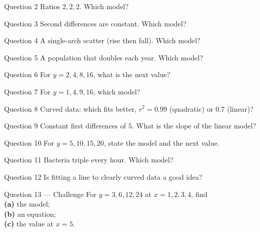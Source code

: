 \documentclass[11pt]{article}
\begin{document}
\begin{qbox}{Question 2}
Ratios $2,2,2$. Which model?\workspace{2.4cm}
\end{qbox}

\begin{qbox}{Question 3}
Second differences are constant. Which model?\workspace{2.4cm}
\end{qbox}

\begin{qbox}{Question 4}
A single-arch scatter (rise then fall). Which model?\workspace{2.4cm}
\end{qbox}

\begin{qbox}{Question 5}
A population that doubles each year. Which model?\workspace{2.4cm}
\end{qbox}

\begin{qbox}{Question 6}
For $y=2,4,8,16$, what is the next value?\workspace{2.4cm}
\end{qbox}

\begin{qbox}{Question 7}
For $y=1,4,9,16$, which model?\workspace{2.4cm}
\end{qbox}

\begin{qbox}{Question 8}
Curved data: which fits better, $r^{2}=0.99$ (quadratic) or $0.7$ (linear)?\workspace{2.4cm}
\end{qbox}

\begin{qbox}{Question 9}
Constant first differences of $5$. What is the slope of the linear model?\workspace{2.4cm}
\end{qbox}

\begin{qbox}{Question 10}
For $y=5,10,15,20$, state the model and the next value.\workspace{2.4cm}
\end{qbox}

\begin{qbox}{Question 11}
Bacteria triple every hour. Which model?\workspace{2.4cm}
\end{qbox}

\begin{qbox}{Question 12}
Is fitting a line to clearly curved data a good idea?\workspace{2.4cm}
\end{qbox}

\begin{qbox}{Question 13 --- Challenge}
For $y=3,6,12,24$ at $x=1,2,3,4$, find \\ \textbf{(a)} the model; \\ \textbf{(b)} an equation; \\ \textbf{(c)} the value at $x=5$.\workspace{3cm}
\end{qbox}
\end{document}
